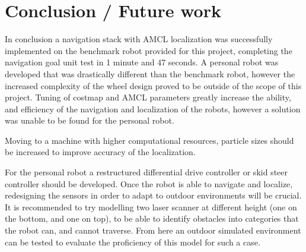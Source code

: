 \documentclass[10pt,journal,compsoc]{IEEEtran}
\begin{document}

\section{Conclusion / Future work}

In conclusion a navigation stack with AMCL localization was successfully implemented on the benchmark robot provided for this project, completing the navigation goal unit test in 1 minute and 47 seconds. A personal robot was developed that was drastically different than the benchmark robot, however the increased complexity of the wheel design proved to be outside of the scope of this project. Tuning of costmap and AMCL parameters greatly increase the ability, and efficiency of the navigation and localization of the robots, however a solution was unable to be found for the personal robot.

Moving to a machine with higher computational resources, particle sizes should be increased to improve accuracy of the localization.

For the personal robot a restructured differential drive controller or skid steer controller should be developed. Once the robot is able to navigate and localize, redesigning the sensors in order to adapt to outdoor environments will be crucial. It is recommended to try modelling two laser scanner at different height (one on the bottom, and one on top), to be able to identify obstacles into categories that the robot can, and cannot traverse. From here an outdoor simulated environment can be tested to evaluate the proficiency of this model for such a case.
\end{document}

